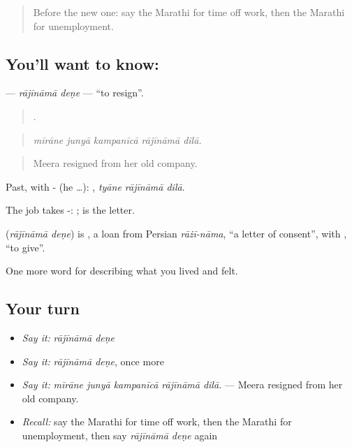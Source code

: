\label{lesson:MR-C510-rajinama-dene}



\begin{quote}
Before the new one: say the Marathi for time off work, then the Marathi for unemployment.
\end{quote}

\subsection*{You'll want to know:  }
\textbf{ } — \emph{rājīnāmā deṇe} — \textquotedblleft{}to resign\textquotedblright{}.

\begin{quote}
    .
\end{quote}

\begin{quote}
\emph{mīrāne junyā kampanīcā rājīnāmā dilā.}
\end{quote}

\begin{quote}
Meera resigned from her old company.
\end{quote}

Past, with - (he …):   , \emph{tyāne rājīnāmā dilā}.

The job takes -:   ;  is the letter.

\begin{cousinweb}
\textbf{ } (\emph{rājīnāmā deṇe}) is , a loan from Persian \emph{rāżī-nāma}, \textquotedblleft{}a letter of consent\textquotedblright{}, with , \textquotedblleft{}to give\textquotedblright{}.
\end{cousinweb}

\begin{grammarlens}[title={What you've built}]
One more word for describing what you lived and felt.
\end{grammarlens}

\subsection*{Your turn}
\begin{itemize}
\raggedright
  \item \emph{Say it:} \emph{rājīnāmā deṇe}
  \item \emph{Say it:} \emph{rājīnāmā deṇe}, once more
  \item \emph{Say it:} \emph{mīrāne junyā kampanīcā rājīnāmā dilā.} — Meera resigned from her old company.
  \item \emph{Recall:} say the Marathi for time off work, then the Marathi for unemployment, then say \emph{rājīnāmā deṇe} again
\end{itemize}

